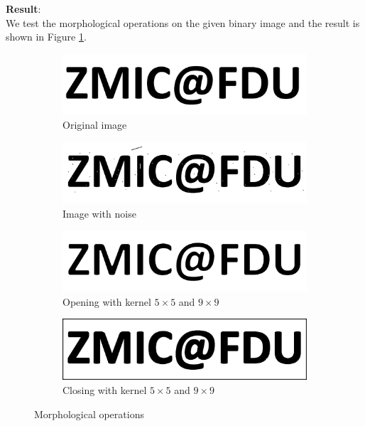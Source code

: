 \documentclass[UTF8]{ctexart}
\begin{document}
\textbf{Result}:\\
We test the morphological operations on the given binary image and the result is shown in Figure \ref{fig:morph}.\\
\begin{figure}[htbp]
    \centering
    \begin{subfigure}{0.5\textwidth}
        \centering
        \includegraphics[width=\linewidth]{zmic_fdu.png}
        \caption{Original image}
    \end{subfigure}%
    \hfill
    \begin{subfigure}{0.5\textwidth}
        \centering
        \includegraphics[width=\linewidth]{zmic_fdu_noise.png}
        \caption{Image with noise}
    \end{subfigure}%

    \vspace{0.5cm}
    \centering
    \begin{subfigure}{0.5\textwidth}
        \centering
        \includegraphics[width=\linewidth]{zmic_fdu_clear.png}
        \caption{Opening with kernel $5\times 5$ and  $9\times 9$}
    \end{subfigure}%
    \hfill
    \begin{subfigure}{0.5\textwidth}
        \centering
        \includegraphics[width=\linewidth]{zmic_fdu_clear1.png}
        \caption{Closing with kernel $5\times 5$ and  $9\times 9$}
    \end{subfigure}%
    \caption{Morphological operations}
    \label{fig:morph}
\end{figure}
\end{document}
